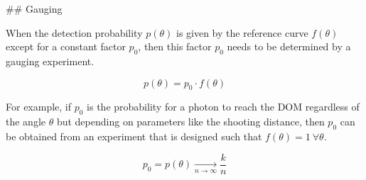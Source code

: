 ## Gauging

When the detection probability $p(\theta)$ is given by the reference curve $f(\theta)$ except for a constant factor $p_0$, then this factor $p_0$ needs to be determined by a gauging experiment.

$$ p(\theta) = p_0 \cdot f(\theta) $$

For example, if $p_0$ is the probability for a photon to reach the DOM regardless of the angle $\theta$ but depending on parameters like the shooting distance, then $p_0$ can be obtained from an experiment that is designed such that $f(\theta) = 1 \ \forall \theta$.

$$ p_0 = p(\theta) \underset{n \to \infty}{\rightarrow} \frac{k}{n} $$